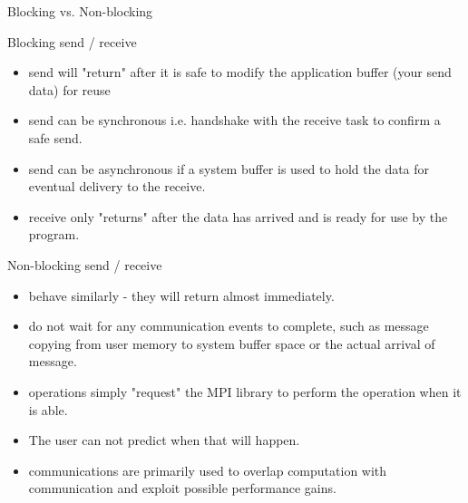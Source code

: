 \documentclass[9pt,c]{beamer}
\begin{document}
\begin{frame}[allowframebreaks]{Blocking vs. Non-blocking}
  \begin{block}{Blocking send / receive }
    \begin{itemize}
      \item send will "return" after it is safe to modify the application buffer (your send data) for reuse
      \item send can be synchronous i.e. handshake with the receive task to confirm a safe send.
      \item send can be asynchronous if a system buffer is used to hold the data for eventual delivery to the receive.
      \item receive only "returns" after the data has arrived and is ready for use by the program.
    \end{itemize}
  \end{block}

  \framebreak

  \begin{block}{Non-blocking send / receive}
    \begin{itemize}
      \item behave similarly - they will return almost immediately. 
      \item do not wait for any communication events to complete, such as message copying from user memory to system buffer space or the actual arrival of message.
      \item operations simply "request" the MPI library to perform the operation when it is able. 
      \item[] The user can not predict when that will happen.
      \item communications are primarily used to overlap computation with communication and exploit possible performance gains.
    \end{itemize}
  \end{block}

  \framebreak


\end{frame}
\end{document}
